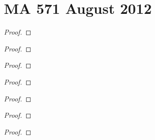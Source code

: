 \chapter{MA 571 August 2012}
\begin{problem}
\end{problem}
\begin{proof}
\end{proof}
\begin{problem}
\end{problem}
\begin{proof}
\end{proof}
\begin{problem}
\end{problem}
\begin{proof}
\end{proof}
\begin{problem}
\end{problem}
\begin{proof}
\end{proof}
\begin{problem}
\end{problem}
\begin{proof}
\end{proof}
\begin{problem}
\end{problem}
\begin{proof}
\end{proof}
\begin{problem}
\end{problem}
\begin{proof}
\end{proof}
